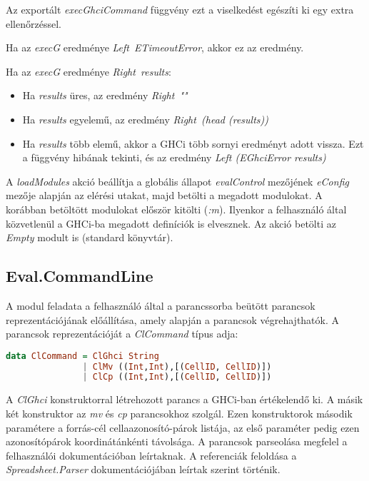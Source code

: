 Az exportált \textit{execGhciCommand} függvény ezt a viselkedést egészíti ki egy extra ellenőrzéssel.
\begin{compactenum}
	\item Ha az \textit{execG} eredménye \textit{Left\ ETimeoutError}, akkor ez az eredmény.
	\item Ha az \textit{execG} eredménye \textit{Right\ results}:
	\begin{itemize}
		\item Ha \textit{results} üres, az eredmény \textit{Right\ ""}
		\item Ha \textit{results} egyelemű, az eredmény \textit{Right\ (head (results))}
		\item Ha \textit{results} több elemű, akkor a GHCi több sornyi eredményt adott vissza. Ezt a függvény hibának tekinti, és az eredmény \textit{Left (EGhciError results)}
	\end{itemize}
\end{compactenum}

A \textit{loadModules} akció beállítja a globális állapot \textit{evalControl} mezőjének \textit{eConfig} mezője alapján az elérési utakat, majd betölti a megadott modulokat. A korábban betöltött modulokat először kitölti (\textit{:m}). Ilyenkor a felhasználó által közvetlenül a GHCi-ba megadott definíciók is elvesznek. Az akció betölti az \textit{Empty} modult is (standard könyvtár).

\subsection{Eval.CommandLine}

A modul feladata a felhasználó által a parancssorba beütött parancsok reprezentációjának előállítása, amely alapján a parancsok végrehajthatók. A parancsok reprezentációját a \textit{ClCommand} típus adja:

\begin{lstlisting}[language={Haskell}]
data ClCommand = ClGhci String
               | ClMv ((Int,Int),[(CellID, CellID)])
               | ClCp ((Int,Int),[(CellID, CellID)])
\end{lstlisting}

A \textit{ClGhci} konstruktorral létrehozott parancs a GHCi-ban értékelendő ki. A másik két konstruktor az \textit{mv} és \textit{cp} parancsokhoz szolgál. Ezen konstruktorok második paramétere a forrás-cél cellaazonosító-párok listája, az első paraméter pedig ezen azonosítópárok koordinátánkénti távolsága. A parancsok parseolása megfelel a felhasználói dokumentációban leírtaknak. A referenciák feloldása a \textit{Spreadsheet.Parser} dokumentációjában leírtak szerint történik.

